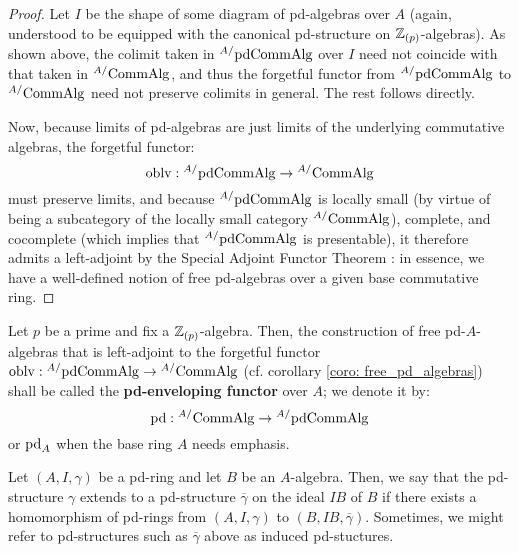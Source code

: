                 \begin{proof}
                    Let $I$ be the shape of some diagram of pd-algebras over $A$ (again, understood to be equipped with the canonical pd-structure on $\mathbb{Z}_{(p)}$-algebras). As shown above, the colimit taken in ${}^{A/}\mathrm{pd}\mathrm{Comm}\mathrm{Alg}$ over $I$ need not coincide with that taken in ${}^{A/}\mathrm{Comm}\mathrm{Alg}$, and thus the forgetful functor from ${}^{A/}\mathrm{pd}\mathrm{Comm}\mathrm{Alg}$ to ${}^{A/}\mathrm{Comm}\mathrm{Alg}$ need not preserve colimits in general. The rest follows directly. 
                    
                    Now, because limits of pd-algebras are just limits of the underlying commutative algebras, the forgetful functor:
                        $$\mathrm{oblv}: {}^{A/}\mathrm{pd}\mathrm{Comm}\mathrm{Alg} \to {}^{A/}\mathrm{Comm}\mathrm{Alg}$$
                    must preserve limits, and because ${}^{A/}\mathrm{pd}\mathrm{Comm}\mathrm{Alg}$ is locally small (by virtue of being a subcategory of the locally small category ${}^{A/}\mathrm{Comm}\mathrm{Alg}$), complete, and cocomplete (which implies that ${}^{A/}\mathrm{pd}\mathrm{Comm}\mathrm{Alg}$ is presentable), it therefore admits a left-adjoint by the Special Adjoint Functor Theorem \cite[Theorem V.8.2]{maclane}: in essence, we have a well-defined notion of free pd-algebras over a given base commutative ring.
                \end{proof}
                
            \begin{definition}[pd-envelopes] \label{def: pd_envelopes}
                Let $p$ be a prime and fix a $\mathbb{Z}_{(p)}$-algebra. Then, the construction of free pd-$A$-algebras that is left-adjoint to the forgetful functor $\mathrm{oblv}: {}^{A/}\mathrm{pd}\mathrm{Comm}\mathrm{Alg} \to {}^{A/}\mathrm{Comm}\mathrm{Alg}$ (cf. corollary \ref{coro: free_pd_algebras}) shall be called the \textbf{pd-enveloping functor} over $A$; we denote it by:
                    $$\mathrm{pd}: {}^{A/}\mathrm{Comm}\mathrm{Alg} \to {}^{A/}\mathrm{pd}\mathrm{Comm}\mathrm{Alg}$$
                or $\mathrm{pd}_A$ when the base ring $A$ needs emphasis.
            \end{definition}
            
            \begin{definition}
                Let $(A, I, \gamma)$ be a pd-ring and let $B$ be an $A$-algebra. Then, we say that the pd-structure $\gamma$ extends to a pd-structure $\overline{\gamma}$ on the ideal $IB$ of $B$ if there exists a homomorphism of pd-rings from $(A, I, \gamma)$ to $(B, IB, \overline{\gamma})$. Sometimes, we might refer to pd-structures such as $\overline{\gamma}$ above as induced pd-stuctures. 
            \end{definition}
            
